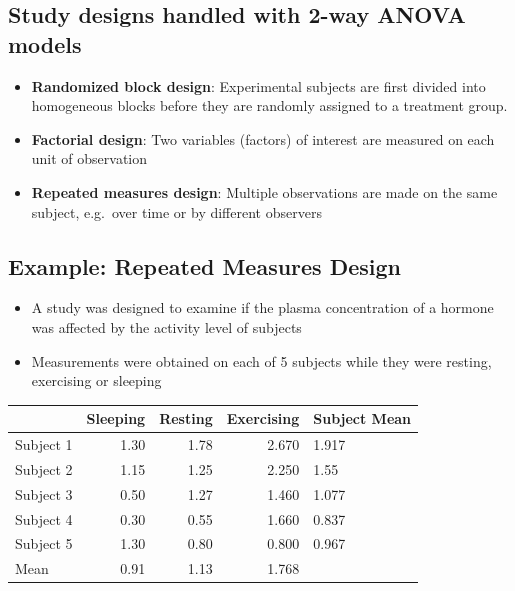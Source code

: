 \documentclass[
]{book}
\providecommand{\tightlist}{%
  \setlength{\itemsep}{0pt}\setlength{\parskip}{0pt}}
\begin{document}
\hypertarget{study-designs-handled-with-2-way-anova-models}{%
\subsection{Study designs handled with 2-way ANOVA models}\label{study-designs-handled-with-2-way-anova-models}}

\begin{itemize}
\tightlist
\item
  \textbf{Randomized block design}: Experimental subjects are first divided into homogeneous blocks before they are randomly assigned to a treatment group.
\item
  \textbf{Factorial design}: Two variables (factors) of interest are measured on each unit of observation
\item
  \textbf{Repeated measures design}: Multiple observations are made on the same subject, e.g.~over time or by different observers
\end{itemize}

\hypertarget{example-repeated-measures-design}{%
\subsection{Example: Repeated Measures Design}\label{example-repeated-measures-design}}

\begin{itemize}
\tightlist
\item
  A study was designed to examine if the plasma concentration of a hormone was affected by the activity level of subjects
\item
  Measurements were obtained on each of 5 subjects while they were resting, exercising or sleeping
\end{itemize}

\begin{tabular}{l|r|r|r|l}
\hline
  &  Sleeping &  Resting &  Exercising  &    Subject Mean\\
\hline
Subject 1 & 1.30 & 1.78 & 2.670 & 1.917\\
\hline
Subject 2 & 1.15 & 1.25 & 2.250 & 1.55\\
\hline
Subject 3 & 0.50 & 1.27 & 1.460 & 1.077\\
\hline
Subject 4 & 0.30 & 0.55 & 1.660 & 0.837\\
\hline
Subject 5 & 1.30 & 0.80 & 0.800 & 0.967\\
\hline
Mean & 0.91 & 1.13 & 1.768 & \\
\hline
\end{tabular}
\end{document}
